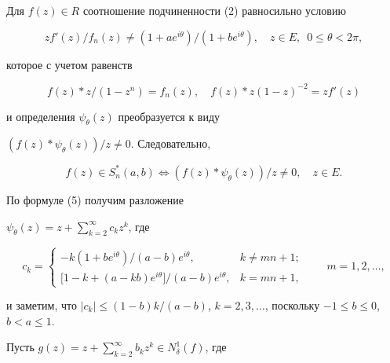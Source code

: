 \begin{pf} 


Для $f(z)\in R$ соотношение подчиненности (2) равносильно условию 


$$ 


zf'(z)/f_n(z)\ne (1+ae^{i\theta})/(1+be^{i\theta}),\quad 


z\in E,\ \; 0\le\theta<2\pi, 


$$ 


которое с учетом равенств 


\begin{equation} 


f(z)* z/(1-z^n)=f_n(z),\quad 


f(z)* z(1-z)^{-2}=zf'(z) 


\end{equation} 


и определения $\psi_\theta(z)$ преобразуется к виду 


$(f(z)*\psi_\theta(z))/z\ne 0$. Следовательно, 


\begin{equation} 


f(z)\in S^*_n(a,b)\Longleftrightarrow 


(f(z)* \psi_\theta(z))/z\ne 0,\quad z\in E. 


\end{equation} 


По формуле (5) получим разложение 


$\psi_\theta(z)=z+\sum\limits^\infty_{k=2}c_k z^k$, где 


$$ 


c_k= 


\begin{cases} 


-k(1+b e^{i\theta})/(a-b)e^{i\theta}, & k\ne m n+1;\\ 


{[}1-k+(a-k b)e^{i\theta}]/(a-b)e^{i\theta}, & k=m n+1, 


\end{cases} 


\qquad m=1,2,\dotsc, 


$$ 


и заметим, что $|c_k|\le(1-b)k/(a-b)$, $k=2,3,\dotsc$, поскольку $-1\le 


b\le 0$, $b<a\le 1$. 


 


Пусть $g(z)=z+\sum\limits^\infty_{k=2}b_k z^k\in N^1_\delta(f)$, где 



\end{pf}
